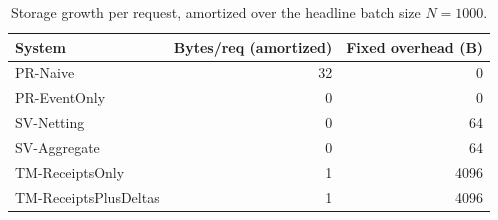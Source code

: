\begin{table}[t]
\centering
\caption{Storage growth per request, amortized over the headline batch size $N{=}1000$.}
\label{tab:storage}
\begin{tabular}{lrr}
\hline
System & Bytes/req (amortized) & Fixed overhead (B) \\
\hline
PR-Naive & 32 & 0 \\
PR-EventOnly & 0 & 0 \\
SV-Netting & 0 & 64 \\
SV-Aggregate & 0 & 64 \\
TM-ReceiptsOnly & 1 & 4096 \\
TM-ReceiptsPlusDeltas & 1 & 4096 \\
\hline
\end{tabular}
\end{table}
